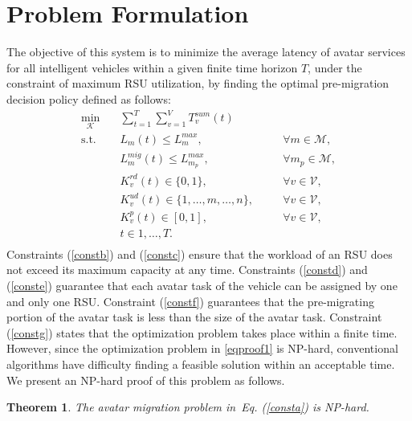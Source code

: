 \documentclass[lettersize,journal]{IEEEtran}
\newtheorem{theorem}{Theorem}
\begin{document}
\section{Problem Formulation} \label{problem}
The objective of this system is to minimize the average latency of avatar services for all intelligent vehicles within a given finite time horizon $T$, under the constraint of maximum RSU utilization, by finding the optimal pre-migration decision policy defined as follows:
\begin{subequations}
\begin{align} 
\min_{\mathcal{K}} \quad &\sum_{t=1}^{T}\sum_{v=1}^{V} T^{sum}_v(t) \label{consta} \\
\text{s.t.} \quad &L_m(t) \leq L^{max}_m, \quad &&\forall m\in \mathcal{M}, \label{constb} \\
&L_{m}^{mig}(t) \leq L^{max}_{m_{p}}, \quad &&\forall m_{p}\in \mathcal{M}, \label{constc} \\
&K^{rd}_v(t)\in\{0,1\},\quad &&\forall v\in \mathcal{V}, \label{constd} \\
&K^{ud}_v(t)\in\{1,\dots,m,\dots,n\},\quad &&\forall v\in \mathcal{V}, \label{conste} \\
&K^p_v(t)\in[0,1],\quad &&\forall v\in \mathcal{V}, \label{constf} \\
&t\in {1, \ldots, T}. \label{constg}\\ \nonumber
\end{align}
\end{subequations}
Constraints (\ref{constb}) and (\ref{constc}) ensure that the workload of an RSU does not exceed its maximum capacity at any time. Constraints (\ref{constd}) and (\ref{conste}) guarantee that each avatar task of the vehicle can be assigned by one and only one RSU. Constraint (\ref{constf}) guarantees that the pre-migrating portion of the avatar task is less than the size of the avatar task. Constraint (\ref{constg}) states that the optimization problem takes place within a finite time. However, since the optimization problem in \eqref{eqproof1} is NP-hard, conventional algorithms have difficulty finding a feasible solution within an acceptable time. We present an NP-hard proof of this problem as follows.

\begin{theorem}
The avatar migration problem in~Eq. (\ref{consta}) is NP-hard.
\end{theorem}
\end{document}

